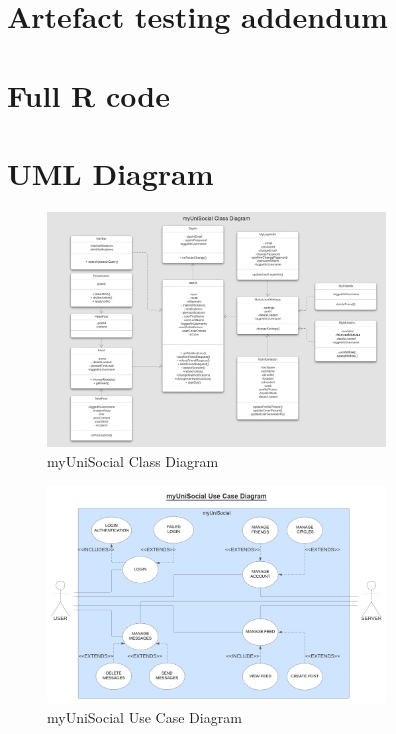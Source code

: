 \documentclass[lettersize,journal]{IEEEtran}
\begin{document}
\section{Artefact testing addendum}


\section{Full R code}
\newpage
\onecolumn
\section{{UML Diagram}}
\begin{figure}[h!]
	\centering
		\includegraphics[width=0.8\textwidth]{myUniSocialClassDiagram.png}
		\caption{myUniSocial Class Diagram}
		\label{figure 3}

\end{figure}
\begin{figure}[h!]
\centering
 		\includegraphics[width=0.8\textwidth]{myUniSocialUseCaseDiagram.png}
		\caption{myUniSocial Use Case Diagram}
		\label{figure 4}

\end{figure}
\end{document}
